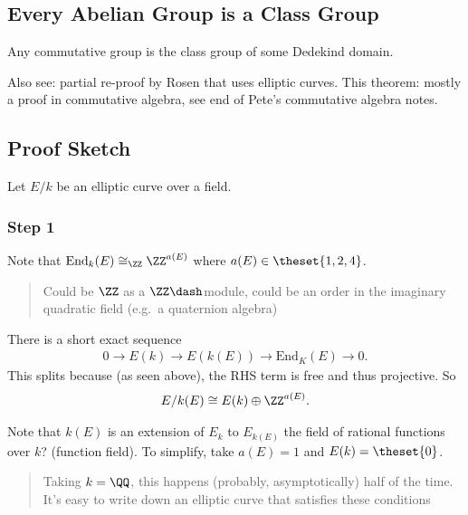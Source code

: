 \hypertarget{every-abelian-group-is-a-class-group}{%
\subsection{Every Abelian Group is a Class
Group}\label{every-abelian-group-is-a-class-group}}

\begin{description}
\tightlist
\item[Theorem (Claborn - Leedham - Green - Clark)]
Any commutative group is the class group of some Dedekind domain.
\end{description}

Also see: partial re-proof by Rosen that uses elliptic curves. This
theorem: mostly a proof in commutative algebra, see end of Pete's
commutative algebra notes.

\hypertarget{proof-sketch}{%
\subsection{Proof Sketch}\label{proof-sketch}}

Let \(E/k\) be an elliptic curve over a field.

\hypertarget{step-1}{%
\subsubsection{Step 1}\label{step-1}}

Note that \(\mathrm{End}_k(E) \cong_\ZZ \ZZ^{a(E)}\) where
\(a(E) \in \theset{1,2,4}\).

\begin{quote}
Could be \(\ZZ\) as a \(\ZZ\dash\)module, could be an order in the
imaginary quadratic field (e.g.~a quaternion algebra)
\end{quote}

There is a short exact sequence
\begin{align*}0 \to E(k) \to E(k(E)) \to \mathrm{End}_K(E) \to 0.\end{align*}
This splits because (as seen above), the RHS term is free and thus
projective. So
\begin{align*}E / k(E) \cong E(k) \oplus \ZZ^{a(E)}.\end{align*}

Note that \(k(E)\) is an extension of \(E_k\) to \(E_{k(E)}\) the field
of rational functions over \(k\)? (function field). To simplify, take
\(a(E) = 1\) and \(E(k) = \theset{0}\).

\begin{quote}
Taking \(k=\QQ\), this happens (probably, asymptotically) half of the
time. It's easy to write down an elliptic curve that satisfies these
conditions
\end{quote}

